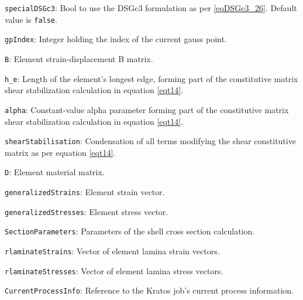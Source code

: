 \texttt{specialDSGc3}: Bool to use the DSGc3 formulation as per \ref{eqDSGc3_26}. Default value is \texttt{false}.

\texttt{gpIndex}: Integer holding the index of the current gauss point.

\texttt{B}: Element strain-displacement B matrix.

\texttt{h\_e}: Length of the element's longest edge, forming part of the constitutive matrix shear stabilization calculation in equation \ref{eqt14}.

\texttt{alpha}: Constant-value alpha parameter forming part of the constitutive matrix shear stabilization calculation in equation \ref{eqt14}.

\texttt{shearStabilisation}: Condensation of all terms modifying the shear constitutive matrix as per equation \ref{eqt14}.

\texttt{D}: Element material matrix.

\texttt{generalizedStrains}: Element strain vector.

\texttt{generalizedStresses}: Element stress vector.

\texttt{SectionParameters}: Parameters of the shell cross section calculation.

\texttt{rlaminateStrains}: Vector of element lamina strain vectors.

\texttt{rlaminateStresses}: Vector of element lamina stress vectors.

\texttt{CurrentProcessInfo}: Reference to the Kratos job's current process information.
